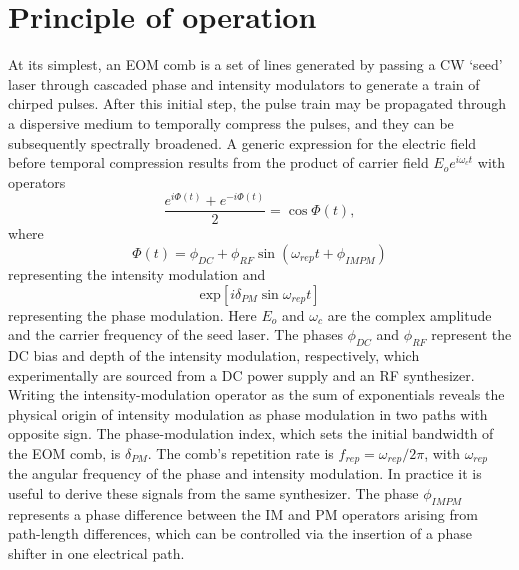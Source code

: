\section{Principle of operation}
At its simplest, an EOM comb is a set of lines generated by passing a CW `seed' laser through cascaded phase and intensity modulators to generate a train of chirped pulses. After this initial step, the pulse train may be propagated through a dispersive medium to temporally compress the pulses, and they can be subsequently spectrally broadened. A generic expression for the electric field before temporal compression results from the product of carrier field $E_oe^{i\omega_ct}$ with operators
\begin{equation}
\frac{e^{i\Phi(t)}+e^{-i\Phi(t)}}{2}=\cos\Phi(t),
\end{equation}
where
\begin{equation}
\Phi(t)=\phi_{DC}+\phi_{RF}\sin{(\omega_{rep}t+\phi_{IMPM})}
\end{equation}
representing the intensity modulation and 
\begin{equation}
\mathrm{exp}\left[i\delta_{PM} \sin{\omega_{rep} t}\right]
\end{equation} representing the phase modulation. Here $E_o$ and $\omega_c$ are the complex amplitude and the carrier frequency of the seed laser. The phases  $\phi_{DC}$ and $\phi_{RF}$ represent the DC bias and depth of the intensity modulation, respectively, which experimentally are sourced from a DC power supply and an RF synthesizer. Writing the intensity-modulation operator as the sum of exponentials reveals the physical origin of intensity modulation as phase modulation in two paths with opposite sign. The phase-modulation index, which sets the initial bandwidth of the EOM comb, is $\delta_{PM}$. The comb's repetition rate is $f_{rep}=\omega_{rep}/2\pi$, with $\omega_{rep}$ the angular frequency of the phase and intensity modulation. In practice it is useful to derive these signals from the same synthesizer. The phase $\phi_{IMPM}$ represents a phase difference between the IM and PM operators arising from path-length differences, which can be controlled via the insertion of a phase shifter in one electrical path. 

